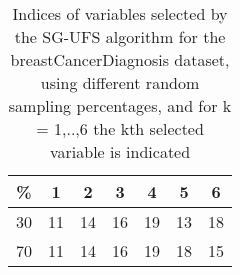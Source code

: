 \begin{table}
	\begin{center}
		\begin{tabular}{c c c c c c c}
			\% & 1 & 2 & 3 & 4 & 5 & 6 \\
			\hline
			30 & 11 & 14 & 16 & 19 & 13 & 18 \\
			70 & 11 & 14 & 16 & 19 & 18 & 15 \\
		\end{tabular}
	\end{center}
	\caption{Indices of variables selected by the SG-UFS algorithm for the breastCancerDiagnosis dataset, using different random sampling percentages, and for k = 1,..,6 the kth selected variable is indicated}
\end{table}
